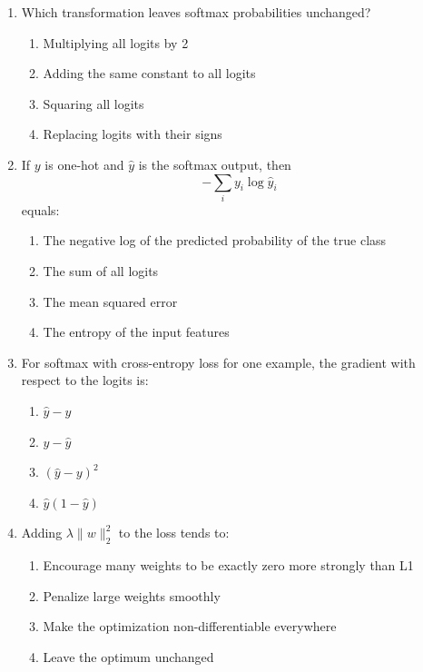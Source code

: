 \documentclass[11pt]{article}
\newcommand{\cmark}{\ding{51}}
\begin{document}
\begin{enumerate}[leftmargin=*]
\item Which transformation leaves softmax probabilities unchanged?

\begin{enumerate}[label=\Alph*.]
    \item Multiplying all logits by 2
    \item Adding the same constant to all logits \cmark
    \item Squaring all logits
    \item Replacing logits with their signs
\end{enumerate}

\item If $y$ is one-hot and $\hat y$ is the softmax output, then
\[
-\sum_i y_i \log \hat y_i
\]
equals:

\begin{enumerate}[label=\Alph*.]
    \item The negative log of the predicted probability of the true class \cmark
    \item The sum of all logits
    \item The mean squared error
    \item The entropy of the input features
\end{enumerate}

\item For softmax with cross-entropy loss for one example, the gradient with respect to the logits is:

\begin{enumerate}[label=\Alph*.]
    \item $\hat y-y$ \cmark
    \item $y-\hat y$
    \item $(\hat y-y)^2$
    \item $\hat y(1-\hat y)$
\end{enumerate}

\item Adding $\lambda \|w\|_2^2$ to the loss tends to:

\begin{enumerate}[label=\Alph*.]
    \item Encourage many weights to be exactly zero more strongly than L1
    \item Penalize large weights smoothly \cmark
    \item Make the optimization non-differentiable everywhere
    \item Leave the optimum unchanged
\end{enumerate}


\end{enumerate}
\end{document}

